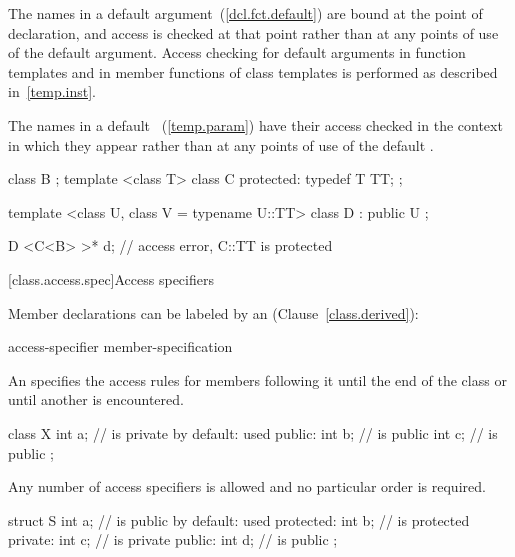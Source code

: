 \pnum
{}%
%
The names in a default argument~(\ref{dcl.fct.default}) are
bound at the point of declaration, and access is checked at that
point rather than at any points of use of the default argument.
Access checking for default arguments in function templates and in
member functions of class templates is performed as described in~\ref{temp.inst}.

\pnum
The names in a default ~(\ref{temp.param})
have their access checked in the context in which they appear rather than at any
points of use of the default . \enterexample
\begin{codeblock}
class B { };
template <class T> class C {
protected:
  typedef T TT;
};

template <class U, class V = typename U::TT>
class D : public U { };

D <C<B> >* d;       // access error, C::TT is protected
\end{codeblock}
\exitexample

[class.access.spec]{Access specifiers}%

\pnum
Member declarations can be labeled by an
(Clause~\ref{class.derived}):

\begin{ncsimplebnf}
access-specifier \terminal{:} member-specification\opt
\end{ncsimplebnf}

An
specifies the access rules for members following it
until the end of the class or until another
is encountered.
\enterexample

\begin{codeblock}
class X {
  int a;            //  is private by default:  used
public:
  int b;            //  is public
  int c;            //  is public
};
\end{codeblock}
\exitexample

\pnum
Any number of access specifiers is allowed and no particular order is required.
\enterexample

\begin{codeblock}
struct S {
  int a;            //  is public by default:  used
protected:
  int b;            //  is protected
private:
  int c;            //  is private
public:
  int d;            //  is public
};
\end{codeblock}
\exitexample

